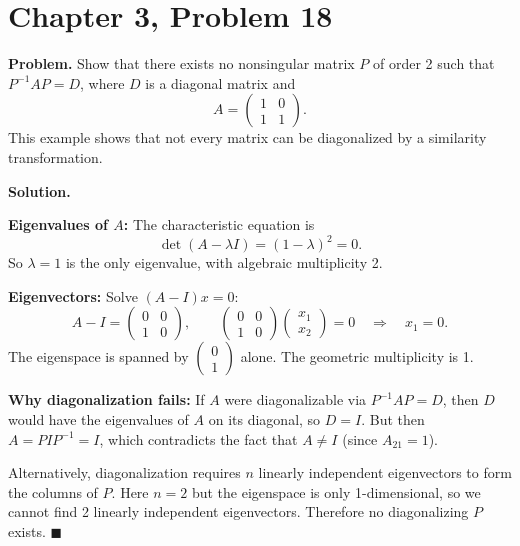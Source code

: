 \documentclass[12pt]{article}
\begin{document}
\section*{Chapter 3, Problem 18}

\textbf{Problem.} Show that there exists no nonsingular matrix $P$ of order 2 such that $P^{-1}AP = D$, where $D$ is a diagonal matrix and
\[
A = \begin{pmatrix} 1 & 0 \\ 1 & 1 \end{pmatrix}.
\]
This example shows that not every matrix can be diagonalized by a similarity transformation.

\bigskip
\textbf{Solution.}

\textbf{Eigenvalues of $A$:} The characteristic equation is
\[
\det(A - \lambda I) = (1 - \lambda)^2 = 0.
\]
So $\lambda = 1$ is the only eigenvalue, with algebraic multiplicity 2.

\medskip
\textbf{Eigenvectors:} Solve $(A - I)x = 0$:
\[
A - I = \begin{pmatrix} 0 & 0 \\ 1 & 0 \end{pmatrix}, \qquad \begin{pmatrix} 0 & 0 \\ 1 & 0 \end{pmatrix}\begin{pmatrix} x_1 \\ x_2 \end{pmatrix} = 0 \quad \Rightarrow \quad x_1 = 0.
\]
The eigenspace is spanned by $\begin{pmatrix} 0 \\ 1 \end{pmatrix}$ alone. The geometric multiplicity is 1.

\medskip
\textbf{Why diagonalization fails:} If $A$ were diagonalizable via $P^{-1}AP = D$, then $D$ would have the eigenvalues of $A$ on its diagonal, so $D = I$. But then $A = PIP^{-1} = I$, which contradicts the fact that $A \neq I$ (since $A_{21} = 1$).

Alternatively, diagonalization requires $n$ linearly independent eigenvectors to form the columns of $P$. Here $n = 2$ but the eigenspace is only 1-dimensional, so we cannot find 2 linearly independent eigenvectors. Therefore no diagonalizing $P$ exists. \hfill $\blacksquare$
\end{document}
